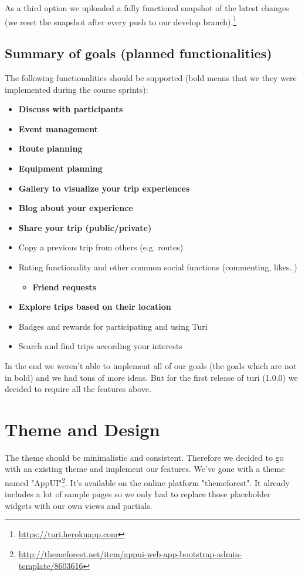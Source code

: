 \documentclass[a4paper]{article}
\begin{document}
As a third option we uploaded a fully functional snapshot of the latest changes (we reset the snapshot after every push to our develop branch).\footnote{\url{https://turi.herokuapp.com}}

\subsection{Summary of goals (planned functionalities)}
The following functionalities should be supported (bold means that we they were implemented during the course sprints):
\begin{itemize}
  \item {\textbf{Discuss with participants}}
  \item {\textbf{Event management}}
  \item {\textbf{Route planning}}
  \item {\textbf{Equipment planning}}
  \item {\textbf{Gallery to visualize your trip experiences}}
  \item {\textbf{Blog about your experience}}
  \item {\textbf{Share your trip (public/private)}}
  \item {Copy a previous trip from others (e.g. routes)}
  \item {Rating functionality and other common social functions (commenting, likes..)
  \begin{itemize}
    \item {\textbf{Friend requests}}
  \end{itemize}}
  \item {\textbf{Explore trips based on their location}}
  \item {Badges and rewards for participating and using Turi}
  \item {Search and find trips according your interests}
\end{itemize}

\noindent
In the end we weren't able to implement all of our goals (the goals which are not in bold) and we had tons of more ideas. But for the first release of turi (1.0.0) we decided to require all the features above.\\

\section{Theme and Design}
The theme should be minimalistic and consistent. Therefore we decided to go with an existing theme and implement our features. We've gone with a theme named "AppUI"\footnote{\url{http://themeforest.net/item/appui-web-app-bootstrap-admin-template/8603616}}. It's available on the online platform "themeforest". It already includes a lot of sample pages so we only had to replace those placeholder widgets with our own views and partials.
\end{document}
